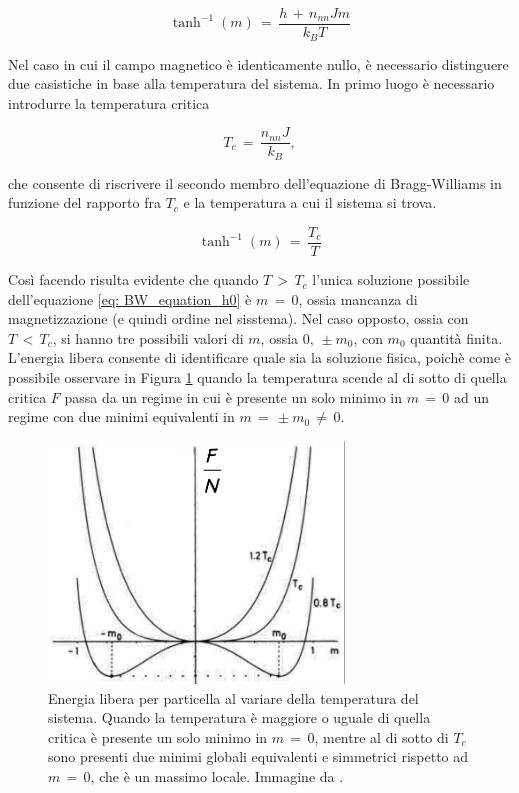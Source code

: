 \begin{equation}
    \tanh^{-1}{\left(m\right)}\,=\,\frac{h\,+\,n_{nn}Jm}{k_B T}
    \label{eq: BW_equation}
\end{equation}

Nel caso in cui il campo magnetico è identicamente nullo, è necessario distinguere due casistiche in base alla temperatura del sistema. 
In primo luogo è necessario introdurre la temperatura critica 

\begin{equation}
    T_c\,=\,\frac{n_{nn}J}{k_B},
    \label{eq: tc_Ising1D_MF}
\end{equation}

che consente di riscrivere il secondo membro dell'equazione di Bragg-Williams in funzione del rapporto fra $T_c$ e la temperatura 
a cui il sistema si trova. 

\begin{equation}
    \tanh^{-1}{\left(m\right)}\,=\,\frac{T_c}{T}
    \label{eq: BW_equation_h0}
\end{equation}

Così facendo risulta evidente che quando $T\,>\,T_c$ l'unica soluzione possibile dell'equazione 
\eqref{eq: BW_equation_h0} è $m\,=\,0$, ossia mancanza di magnetizzazione (e quindi ordine nel sisstema). Nel caso opposto, ossia con $T\,<\,T_c$, si hanno 
tre possibili valori di $m$, ossia $0,\,\pm m_0$, con $m_0$ quantità finita. L'energia libera consente di identificare quale 
sia la soluzione fisica, poichè come è possibile osservare in Figura \ref{fig: FE_Ising1D_MF} quando la temperatura scende al 
di sotto di quella critica $F$ passa da un regime in cui è presente un solo minimo in $m\,=\,0$ ad un regime con due minimi 
equivalenti in $m\,=\,\pm m_0\,\neq\,0$. 

\begin{figure}[h!]
    \centering
    \includegraphics[width=0.7\textwidth]{Immagini/FE_Ising1D_MF.png}
    \caption{ Energia libera per particella al variare della temperatura del sistema. Quando la temperatura è maggiore o uguale 
    di quella critica è presente un solo minimo in $m\,=\,0$, mentre al di sotto di $T_c$ sono presenti due minimi globali equivalenti e 
    simmetrici rispetto ad $m\,=\,0$, che è un massimo locale. Immagine da \cite{galliFSA}.}
    \label{fig: FE_Ising1D_MF}
\end{figure}

